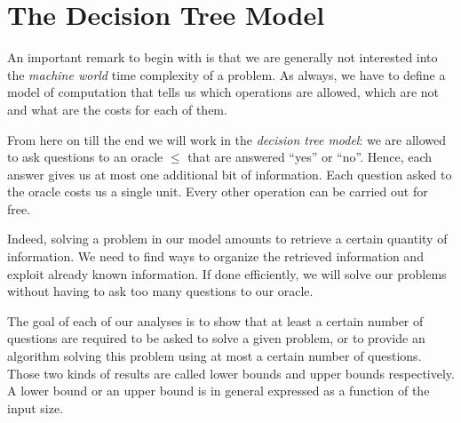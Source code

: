 \section{The Decision Tree Model}
\label{tree:sorting:model}

An important remark to begin with is that we are generally not interested
into the \emph{machine world} time complexity of a problem. As always, we have to
define a model of computation that tells us which operations are allowed, which
are not and what are the costs for each of them.

From here on till the end we will work in the \emph{decision tree model}:
we are allowed to ask questions to an oracle \(\le\) that are answered
``yes'' or ``no''. Hence, each answer gives us at most
one additional bit of information.
Each question asked to the oracle costs us a single unit.
Every other operation can be carried out for free.

Indeed, solving a problem in
our model amounts to retrieve a certain quantity of information. We
need to find ways to organize the retrieved information and exploit already
known information. If done efficiently, we will solve our problems without
having to ask too many questions to our oracle.

The goal of each of our analyses is to show that at least a certain
number of questions are required to be asked to solve a given problem, or
to provide an algorithm solving this problem using at most a certain number of
questions. Those two kinds of results are called lower bounds and upper bounds
respectively. A lower bound or an upper bound is in general expressed as
a function of the input size.
